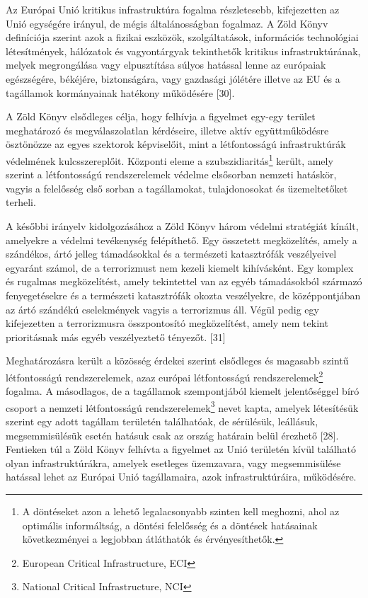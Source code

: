 \documentclass[12pt,magyar,a4paper,oneside]{scrreprt}
\begin{document}
Az Európai Unió kritikus infrastruktúra fogalma részletesebb,
kifejezetten az Unió egységére irányul, de mégis általánosságban
fogalmaz. A Zöld Könyv definíciója szerint azok a fizikai eszközök,
szolgáltatások, információs technológiai létesítmények, hálózatok és
vagyontárgyak tekinthetők kritikus infrastruktúrának, melyek
megrongálása vagy elpusztítása súlyos hatással lenne az európaiak
egészségére, békéjére, biztonságára, vagy gazdasági jólétére illetve az
EU és a tagállamok kormányainak hatékony működésére {[}30{]}.

A Zöld Könyv elsődleges célja, hogy felhívja a figyelmet egy-egy terület
meghatározó és megválaszolatlan kérdéseire, illetve aktív
együttműködésre ösztönözze az egyes szektorok képviselőit, mint a
létfontosságú infrastruktúrák védelmének kulcsszereplőit. Központi eleme
a szubszidiaritás\footnote{A döntéseket azon a lehető legalacsonyabb
  szinten kell meghozni, ahol az optimális informáltság, a döntési
  felelősség és a döntések hatásainak következményei a legjobban
  átláthatók és érvényesíthetők.} került, amely szerint a létfontosságú
rendszerelemek védelme elsősorban nemzeti hatáskör, vagyis a felelősség
első sorban a tagállamokat, tulajdonosokat és üzemeltetőket terheli.

A későbbi irányelv kidolgozásához a Zöld Könyv három védelmi stratégiát
kínált, amelyekre a védelmi tevékenység felépíthető. Egy összetett
megközelítés, amely a szándékos, ártó jelleg támadásokkal és a
természeti katasztrófák veszélyeivel egyaránt számol, de a terrorizmust
nem kezeli kiemelt kihívásként. Egy komplex és rugalmas megközelítést,
amely tekintettel van az egyéb támadásokból származó fenyegetésekre és a
természeti katasztrófák okozta veszélyekre, de középpontjában az ártó
szándékú cselekmények vagyis a terrorizmus áll. Végül pedig egy
kifejezetten a terrorizmusra összpontosító megközelítést, amely nem
tekint prioritásnak más egyéb veszélyeztető tényezőt. {[}31{]}

Meghatározásra került a közösség érdekei szerint elsődleges és magasabb
szintű létfontosságú rendszerelemek, azaz európai létfontosságú
rendszerelemek\footnote{European Critical Infrastructure, ECI} fogalma.
A másodlagos, de a tagállamok szempontjából kiemelt jelentőséggel bíró
csoport a nemzeti létfontosságú rendszerelemek\footnote{National
  Critical Infrastructure, NCI} nevet kapta, amelyek létesítésük szerint
egy adott tagállam területén találhatóak, de sérülésük, leállásuk,
megsemmisülésük esetén hatásuk csak az ország határain belül érezhető
{[}28{]}. Fentieken túl a Zöld Könyv felhívta a figyelmet az Unió
területén kívül található olyan infrastruktúrákra, amelyek esetleges
üzemzavara, vagy megsemmisülése hatással lehet az Európai Unió
tagállamaira, azok infrastruktúráira, működésére.
\end{document}

